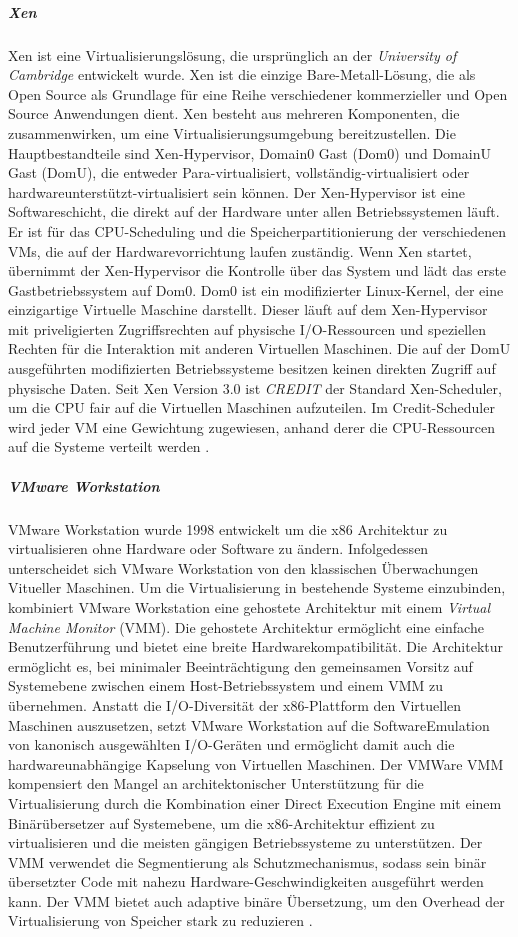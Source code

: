 \subparagraph {Xen}
Xen ist eine Virtualisierungslösung, die ursprünglich an der \emph{University of Cambridge} entwickelt wurde. Xen ist die einzige Bare-Metall-Lösung, die als Open Source als Grundlage für eine Reihe verschiedener kommerzieller und Open Source Anwendungen dient. Xen besteht aus mehreren Komponenten, die zusammenwirken, um eine Virtualisierungsumgebung bereitzustellen. Die Hauptbestandteile sind Xen-Hypervisor, Domain0 Gast (Dom0) und DomainU Gast (DomU), die entweder Para-virtualisiert, vollständig-virtualisiert oder hardwareunterstützt-virtualisiert sein können. Der Xen-Hypervisor ist eine Softwareschicht, die direkt auf der Hardware unter allen Betriebssystemen läuft. Er ist für das CPU-Scheduling und die Speicherpartitionierung der verschiedenen VMs, die auf der Hardwarevorrichtung laufen zuständig. Wenn Xen startet, übernimmt der Xen-Hypervisor die Kontrolle über das System und lädt das erste Gastbetriebssystem auf Dom0. Dom0 ist ein modifizierter Linux-Kernel, der eine einzigartige Virtuelle Maschine darstellt. Dieser läuft auf dem Xen-Hypervisor mit priveligierten Zugriffsrechten auf physische I/O-Ressourcen und speziellen Rechten für die Interaktion mit anderen Virtuellen Maschinen. Die auf der DomU ausgeführten modifizierten Betriebssysteme besitzen keinen direkten Zugriff auf physische Daten. Seit Xen Version 3.0 ist \emph{CREDIT} der Standard Xen-Scheduler, um die CPU fair auf die Virtuellen Maschinen aufzuteilen. Im Credit-Scheduler wird jeder VM eine Gewichtung zugewiesen, anhand derer die CPU-Ressourcen auf die Systeme verteilt werden \cite{Fayyad-Kazan2013BenchmarkingHypervisors}. 

\subparagraph {VMware Workstation}
VMware Workstation wurde 1998 entwickelt um die x86 Architektur zu virtualisieren ohne Hardware oder Software zu ändern. Infolgedessen unterscheidet sich VMware Workstation von den klassischen Überwachungen Vitueller Maschinen. Um die Virtualisierung in bestehende Systeme einzubinden, kombiniert VMware Workstation eine gehostete Architektur mit einem \emph{Virtual Machine Monitor} (VMM). Die gehostete Architektur ermöglicht eine einfache Benutzerführung und bietet eine breite Hardwarekompatibilität. Die Architektur ermöglicht es, bei minimaler Beeinträchtigung den gemeinsamen Vorsitz auf Systemebene zwischen einem Host-Betriebssystem und einem VMM zu übernehmen. Anstatt die I/O-Diversität der x86-Plattform den Virtuellen Maschinen auszusetzen, setzt VMware Workstation auf die SoftwareEmulation von kanonisch ausgewählten I/O-Geräten und ermöglicht damit auch die hardwareunabhängige Kapselung von Virtuellen Maschinen. Der VMWare VMM kompensiert den Mangel an architektonischer Unterstützung für die Virtualisierung durch die Kombination einer Direct Execution Engine mit einem Binärübersetzer auf Systemebene, um die x86-Architektur effizient zu virtualisieren und die meisten gängigen Betriebssysteme zu unterstützen. Der VMM verwendet die Segmentierung als Schutzmechanismus, sodass sein binär übersetzter Code mit nahezu Hardware-Geschwindigkeiten ausgeführt werden kann. Der VMM bietet auch adaptive binäre Übersetzung, um den Overhead der Virtualisierung von Speicher stark zu reduzieren \cite{Bugnion2012BringingWorkstation}.


